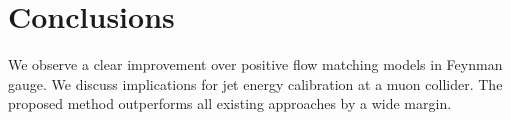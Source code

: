 \section{Conclusions}\label{sec:conclusions}

We observe a clear improvement over positive flow matching models in
Feynman gauge. We discuss implications for jet energy calibration at a
muon collider. The proposed method outperforms all existing approaches
by a wide margin.

